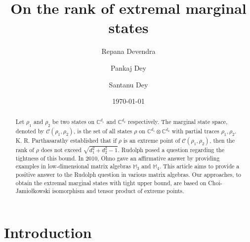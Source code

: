 \documentclass[10pt,reqno]{amsart}
\title{On the rank of extremal marginal states}
\author{Repana Devendra}
\author{Pankaj Dey}
\author{Santanu Dey}
\theoremstyle{definition}
\theoremstyle{plain}
\theoremstyle{remark}
\newcommand{\mbb}[1]{\mathbb{#1}}
\newcommand{\msc}[1]{\mathscr{#1}}
\newcommand{\M}[1]{\mbb{M}_{#1}}%
\numberwithin{equation}{section}%
\begin{document}
\date{\today}

\begin{abstract}
Let $\rho_1$ and $\rho_2$ be two states on $\mathbb{C}^{d_1}$ and $\mathbb{C}^{d_2}$ respectively. The marginal state space, denoted by $\msc{C}(\rho_1,\rho_2)$, is the set of all states $\rho$ on $\mathbb{C}^{d_1}\otimes \mathbb{C}^{d_2}$ with partial traces $\rho_1, \rho_2$. K. R. Parthasarathy established that if $\rho$ is an extreme point of $\msc{C}(\rho_1,\rho_2)$, then the rank of $\rho$ does not exceed $\sqrt{d_1^2+d_2^2-1}$. Rudolph posed a question regarding the tightness of this bound. In 2010, Ohno gave an affirmative answer by providing examples in low-dimensional matrix algebras $\M{3}$ and $\M{4}$. This article aims to provide a positive answer to the Rudolph question in various matrix algebras.
Our approaches, to obtain the extremal marginal states with tight upper bound, are based on Choi-Jamio\l kowski isomorphism and tensor product of extreme points. 

    
\end{abstract}




\maketitle





\section{Introduction}
\end{document}
